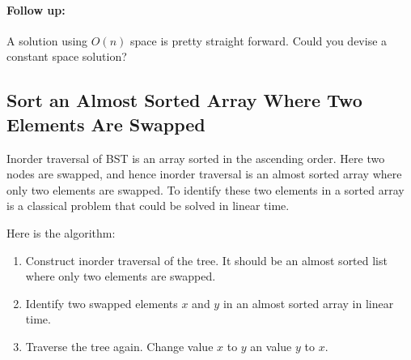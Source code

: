 \paragraph{Follow up:}
\begin{flushleft}
A solution using $O(n)$ space is pretty straight forward. Could you devise a constant space solution?
\end{flushleft}

\subsection{Sort an Almost Sorted Array Where Two Elements Are Swapped}
Inorder traversal of BST is an array sorted in the ascending order. Here two nodes are swapped, and hence inorder traversal is an almost sorted array where only two elements are swapped. To identify these two elements in a sorted array is a classical problem that could be solved in linear time.

Here is the algorithm:

\begin{enumerate}
\item Construct inorder traversal of the tree. It should be an almost sorted list where only two elements are swapped.

\item Identify two swapped elements $x$ and $y$ in an almost sorted array in linear time.

\item Traverse the tree again. Change value $x$ to $y$ an value $y$ to $x$.
\end{enumerate}


